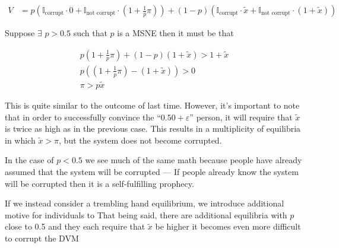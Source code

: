 \documentclass[12pt]{article}
\begin{document}
    \begin{align*}
      V &= p (\mathbb{I}_{\text{corrupt}} \cdot 0 + \mathbb{I}_{\text{not corrupt}} \cdot (1 + \frac{1}{p} \pi)) + (1 - p) (\mathbb{I}_{\text{corrupt}} \cdot \tilde{x} + \mathbb{I}_{\text{not corrupt}} \cdot (1 + \tilde{x}))
    \end{align*}

    Suppose $\exists$ $p > 0.5$ such that $p$ is a MSNE then it must be that

    \begin{align*}
      p (1 + \frac{1}{p} \pi) + (1 - p) (1 + \tilde{x}) > 1 + \tilde{x} \\
      p( (1 + \frac{1}{p} \pi) - (1 + \tilde{x})) > 0 \\
      \pi > p \tilde{x}
    \end{align*}

    This is quite similar to the outcome of last time. However, it's important to note that in
    order to successfully convince the ``$0.50 + \varepsilon$'' person, it will require that
    $\tilde{x}$ is twice as high as in the previous case. This results in a multiplicity of
    equilibria in which $\tilde{x} > \pi$, but the system does not become corrupted.

    In the case of $p < 0.5$ we see much of the same math because people have already assumed that
    the system will be corrupted --- If people already know the system will be corrupted then it
    is a self-fulfilling prophecy.

    If we instead consider a trembling hand equilibrium, we introduce additional motive for
    individuals to That being said, there are additional equilibria with $p$
    close to 0.5 and they each require that $\tilde{x}$ be higher it becomes even more difficult
    to corrupt the DVM
\end{document}
